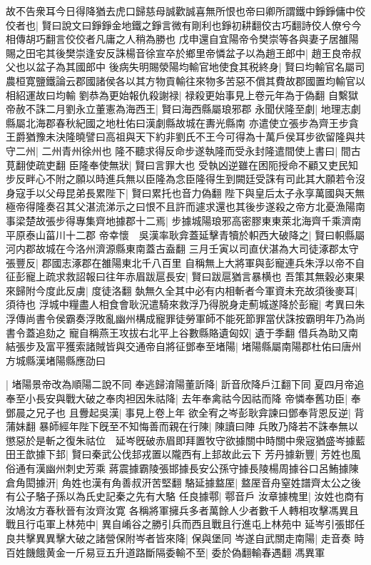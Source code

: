 故不告衆耳今日得降猶去虎口歸慈母誠歡誠喜無所恨也帝曰卿所謂鐵中錚錚傭中佼佼者也|{
	賢曰說文曰錚錚金地鐵之錚言微有剛利也錚初耕翻佼古巧翻詩佼人僚兮今相傳胡巧翻言佼佼者凡庸之人稍為勝也}
戊申還自宜陽帝令樊崇等各與妻子居雒陽賜之田宅其後樊崇逢安反誅楊音徐宣卒於鄉里帝憐盆子以為趙王郎中|{
	趙王良帝叔父也以盆子為其國郎中}
後病失明賜滎陽均輸官地使食其税終身|{
	賢曰均輸官名屬司農桓寛鹽鐵論云郡國諸侯各以其方物貢輸往來物多苦惡不償其費故郡國置均輸官以相紹運故曰均輸}
劉恭為更始報仇殺謝禄|{
	禄殺更始事見上卷元年為于偽翻}
自繫獄帝赦不誅二月劉永立董憲為海西王|{
	賢曰海西縣屬琅邪郡}
永聞伏隆至劇|{
	地理志劇縣屬北海郡春秋紀國之地杜佑曰漢劇縣故城在夀光縣南}
亦遣使立張步為齊王步貪王爵猶豫未決隆曉譬曰高祖與天下約非劉氏不王今可得為十萬戶侯耳步欲留隆與共守二州|{
	二州青州徐州也}
隆不聽求得反命步遂執隆而受永封隆遣間使上書曰|{
	間古莧翻使疏吏翻}
臣隆奉使無狀|{
	賢曰言罪大也}
受執凶逆雖在困阨授命不顧又吏民知步反畔心不附之願以時進兵無以臣隆為念臣隆得生到闕廷受誅有司此其大願若令沒身寇手以父母昆弟長累陛下|{
	賢曰累托也音力偽翻}
陛下與皇后太子永享萬國與天無極帝得隆奏召其父湛流涕示之曰恨不且許而遽求還也其後步遂殺之帝方北憂漁陽南事梁楚故張步得專集齊地據郡十二焉|{
	步據城陽琅邪高密膠東東萊北海齊千乘濟南平原泰山菑川十二郡}
帝幸懷　吳漢率耿弇蓋延擊青犢於軹西大破降之|{
	賢曰軹縣屬河内郡故城在今洛州濟源縣東南蓋古盍翻}
三月壬寅以司直伏湛為大司徒涿郡太守張豐反|{
	郡國志涿郡在雒陽東北千八百里}
自稱無上大將軍與彭寵連兵朱浮以帝不自征彭寵上疏求救詔報曰往年赤眉跋扈長安|{
	賢曰跋扈猶言暴横也}
吾策其無穀必東果來歸附今度此反虜|{
	度徒洛翻}
埶無久全其中必有内相斬者今軍資未充故須後麥耳|{
	須待也}
浮城中糧盡人相食會耿況遣騎來救浮乃得脱身走薊城遂降於彭寵|{
	考異曰朱浮傳尚書令侯霸奏浮敗亂幽州構成寵罪徒勞軍師不能死節罪當伏誅按霸明年乃為尚書令蓋追劾之}
寵自稱燕王攻拔右北平上谷數縣賂遺匈奴|{
	遺于季翻}
借兵為助又南結張步及富平獲索諸賊皆與交通帝自將征鄧奉至堵陽|{
	堵陽縣屬南陽郡杜佑曰唐州方城縣漢堵陽縣應劭曰}


|{
	堵陽景帝改為順陽二說不同}
奉逃歸淯陽董訢降|{
	訢音欣降戶江翻下同}
夏四月帝追奉至小長安與戰大破之奉肉袒因朱祜降|{
	去年奉禽祜今因祜而降}
帝憐奉舊功臣|{
	奉鄧晨之兄子也}
且釁起吳漢|{
	事見上卷上年}
欲全宥之岑彭耿弇諫曰鄧奉背恩反逆|{
	背蒲妹翻}
暴師經年陛下旣至不知悔善而親在行陳|{
	陳讀曰陣}
兵敗乃降若不誅奉無以懲惡於是斬之復朱祜位　延岑旣破赤眉即拜置牧守欲據關中時關中衆宼猶盛岑據藍田王歆據下邽|{
	賢曰秦武公伐邽戎置以隴西有上邽故此云下}
芳丹據新豐|{
	芳姓也風俗通有漢幽州刺史芳乘}
蔣震據霸陵張邯據長安公孫守據長陵楊周據谷口呂鮪據陳倉角閎據汧|{
	角姓也漢有角善叔汧苦堅翻}
駱延據盩厔|{
	盩厔音舟窒姓譜齊太公之後有公子駱子孫以為氏史記秦之先有大駱}
任良據鄠|{
	鄠音戶}
汝章據槐里|{
	汝姓也商有汝鳩汝方春秋晉有汝齊汝寛}
各稱將軍擁兵多者萬餘人少者數千人轉相攻擊馮異且戰且行屯軍上林苑中|{
	異自崤谷之勝引兵而西且戰且行進屯上林苑中}
延岑引張邯任良共擊異異擊大破之諸營保附岑者皆來降|{
	保與堡同}
岑遂自武關走南陽|{
	走音奏}
時百姓饑餓黄金一斤易豆五升道路斷隔委輸不至|{
	委於偽翻輸春遇翻}
馮異軍

